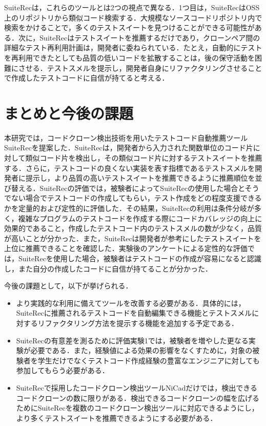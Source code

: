 \documentclass[12pt]{jarticle} %
\begin{document}
{\sf SuiteRec}は，これらのツールとは2つの視点で異なる．1つ目は，{\sf SuiteRec}はOSS上のリポジトリから類似コード検索する．大規模なソースコードリポジトリ内で検索をかけることで，多くのテストスイートを見つけることができる可能性がある．次に，{\sf SuiteRec}はテストスイートを推薦するだけであり，クローンペア間の詳細なテスト再利用計画は，開発者に委ねられている．たとえ，自動的にテストを再利用できたとしても品質の低いコードを拡散することは，後の保守活動を困難にさせる．テストスメルを提示し，開発者自身にリファクタリングさせることで作成したテストコードに自信が持てると考える．

\newpage
\section{まとめと今後の課題}
本研究では，コードクローン検出技術を用いたテストコード自動推薦ツール{\sf SuiteRec}を提案した．{\sf SuiteRec}は，開発者から入力された関数単位のコード片に対して類似コード片を検出し，その類似コード片に対するテストスイートを推薦する．さらに，テストコードの良くない実装を表す指標であるテストスメルを開発者に提示し，より品質の高いテストスイートを推薦できるように推薦順位を並び替える．{\sf SuiteRec}の評価では，被験者によって{\sf SuiteRec}の使用した場合とそうでない場合でテストコードの作成してもらい，テスト作成をどの程度支援できるかを定量的および定性的に評価した．その結果，{\sf SuiteRec}の利用は条件分岐が多く，複雑なプログラムのテストコードを作成する際にコードカバレッジの向上に効果的であること，作成したテストコード内のテストスメルの数が少なく，品質が高いことが分かった．また，{\sf SuiteRec}は開発者が参考にしたテストスイートを上位に推薦できることを確認した．実験後のアンケートによる定性的な評価では，{\sf SuiteRec}を使用した場合，被験者はテストコードの作成が容易になると認識し，また自分の作成したコードに自信が持てることが分かった．

今後の課題として，以下が挙げられる．

\begin{itemize}
\item より実践的な利用に備えてツールを改善する必要がある．具体的には，{\sf SuiteRec}に推薦されるテストコードを自動編集できる機能とテストスメルに対するリファクタリング方法を提示する機能を追加する予定である．
\item {\sf SuiteRec}の有意差を測るために評価実験1では，被験者を増やした更なる実験が必要である．また，経験値による効果の影響をなくすために，対象の被験者を学生だけでなくテストコード作成経験の豊富なエンジニアに対しても参加してもらう必要がある．
\item {\sf SuiteRec}で採用したコードクローン検出ツール{\sf NiCad}だけでは，検出できるコードクローンの数に限りがある．検出できるコードクローンの幅を広げるために{\sf SuiteRec}を複数のコードクローン検出ツールに対応できるようにし，より多くテストスイートを推薦できるようにする必要がある．
\end{itemize}
\end{document}
